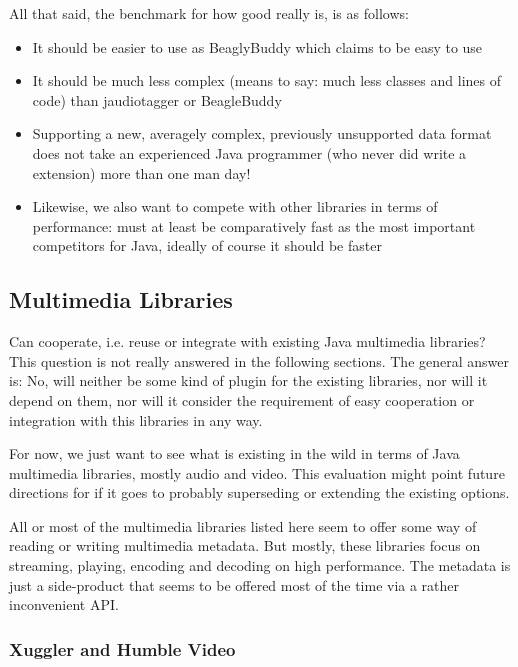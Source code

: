 All that said, the benchmark for how good \LibName{} really is, is as follows:
\begin{itemize}
\item It should be easier to use as BeaglyBuddy which claims to be easy to use
\item It should be much less complex (means to say: much less classes and lines of code) than jaudiotagger or BeagleBuddy
\item Supporting a new, averagely complex, previously unsupported data format does not take an experienced Java programmer (who never did write a \LibName{} extension) more than one man day!
\item Likewise, we also want to compete with other libraries in terms of performance: \LibName{} must at least be comparatively fast as the most important competitors for Java, ideally of course it should be faster
\end{itemize}


\subsection{Multimedia Libraries}
\label{sec:MultimediaLibraries}

Can \LibName{} cooperate, i.e. reuse or integrate with existing Java multimedia libraries? This question is not really answered in the following sections. The general answer is: No, \LibName{} will neither be some kind of plugin for the existing libraries, nor will it depend on them, nor will it consider the requirement of easy cooperation or integration with this libraries in any way.

For now, we just want to see what is existing in the wild in terms of Java multimedia libraries, mostly audio and video. This evaluation might point future directions for \LibName{} if it goes to probably superseding or extending the existing options.

All or most of the multimedia libraries listed here seem to offer some way of reading or writing multimedia metadata. But mostly, these libraries focus on streaming, playing, encoding and decoding on high performance. The metadata is just a side-product that seems to be offered most of the time via a rather inconvenient API.

\subsubsection{Xuggler and Humble Video}%
\label{sec:Xuggler}%

